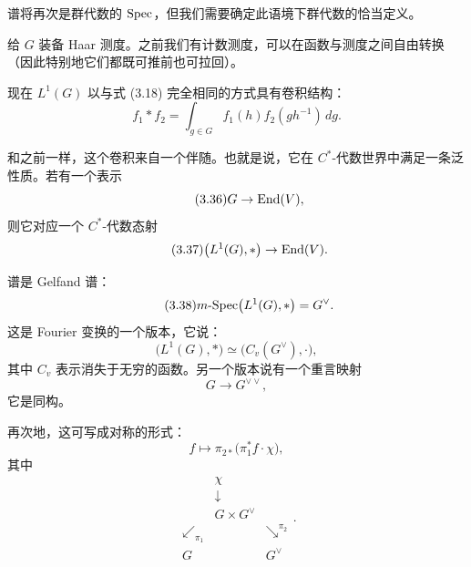 谱将再次是群代数的 $\mathrm{Spec}$，但我们需要确定此语境下群代数的恰当定义。

给 $G$ 装备 Haar 测度。之前我们有计数测度，可以在函数与测度之间自由转换（因此特别地它们都既可推前也可拉回）。

现在 $L^1(G)$ 以与式 (3.18) 完全相同的方式具有卷积结构：
\begin{equation}\tag{3.35}
f_1\ast f_2=\int_{g\in G}f_1(h)f_2(gh^{-1})\,dg.
\end{equation}

和之前一样，这个卷积来自一个伴随。也就是说，它在 $C^{*}$-代数世界中满足一条泛性质。若有一个表示
\begin{equation}\tag{3.36}
G\to\mathrm{End}(V),
\end{equation}
则它对应一个 $C^{*}$-代数态射
\begin{equation}\tag{3.37}
\bigl(L^1(G),\ast\bigr)\to\mathrm{End}(V).
\end{equation}

谱是 Gelfand 谱：
\begin{equation}\tag{3.38}
m\text{-}\mathrm{Spec}\bigl(L^1(G),\ast\bigr)=G^{\vee}.
\end{equation}
这是 Fourier 变换的一个版本，它说：
\begin{equation}\tag{3.39}
\bigl(L^1(G),\ast\bigr)\simeq\bigl(C_v(G^{\vee}),\cdot\bigr),
\end{equation}
其中 $C_v$ 表示消失于无穷的函数。另一个版本说有一个重言映射
\begin{equation}\tag{3.40}
G\to G^{\vee\vee},
\end{equation}
它是同构。

再次地，这可写成对称的形式：
\begin{equation}\tag{3.41}
f\mapsto\pi_{2*}\bigl(\pi_1^{*}f\cdot\chi\bigr),
\end{equation}
其中
\begin{equation}\tag{3.42}
\begin{array}{ccc}
& \chi &\\
& \downarrow &\\
& G\times G^{\vee} &\\
\swarrow_{\pi_1} & & \searrow^{\pi_2}\\
G & & G^{\vee}
\end{array}.
\end{equation}

